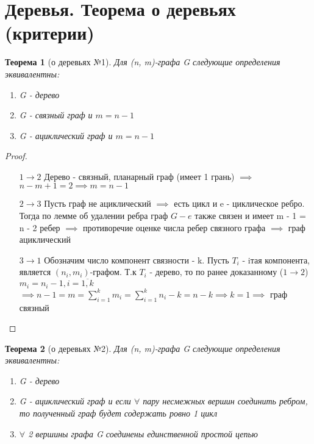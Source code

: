 \documentclass[a4paper]{article}
\newtheorem{theorem}{Теорема}[section]
\theoremstyle{definition}
\theoremstyle{remark}
\begin{document}
    \section{Деревья. Теорема о деревьях (критерии)}
    \begin{theorem}[о деревьях №1]
        Для (n, m)-графа G следующие определения эквивалентны:
        \begin{enumerate}
            \item G - дерево
            \item G - связный граф и $m = n - 1$
            \item G - ациклический граф и $m = n - 1$
        \end{enumerate}
    \end{theorem}
    \begin{proof}
        \begin{itemize}
            \item[$1 \to 2$] Дерево - связный, планарный граф (имеет 1 грань) $\implies$ $n - m + 1 = 2\implies m = n - 1$
            \item[$2 \to 3$] Пусть граф не ациклический $\implies$ есть цикл и e - циклическое ребро.
            Тогда по лемме об удалении ребра граф $G - e$ также связен и имеет m - 1 = n - 2 ребер
            $\implies$ противоречие оценке числа ребер связного графа $\implies$ граф ациклический
            \item[$3 \to 1$] Обозначим число компонент связности - k. Пусть $T_i$ - iтая компонента,
            является $(n_i, m_i)$-графом. Т.к $T_i$ - дерево, то по ранее доказанному ($1 \to 2$) $m_i = n_i - 1, i = \overline{1, k}$
            $\implies n - 1 = m = \sum_{i = 1}^k m_i = \sum_{i = 1}^k n_i - k = n - k \implies k = 1\implies$ граф связный 
        \end{itemize}
    \end{proof}
    \begin{theorem}[о деревьях №2]
        Для (n, m)-графа G следующие определения эквивалентны:
        \begin{enumerate}
            \item G - дерево
            \item G - ациклический граф и если $\forall$ пару несмежных вершин соединить ребром, то
            полученный граф будет содержать ровно 1 цикл
            \item $\forall$ 2 вершины графа G соединены единственной простой цепью
        \end{enumerate}
    \end{theorem}
\end{document}

